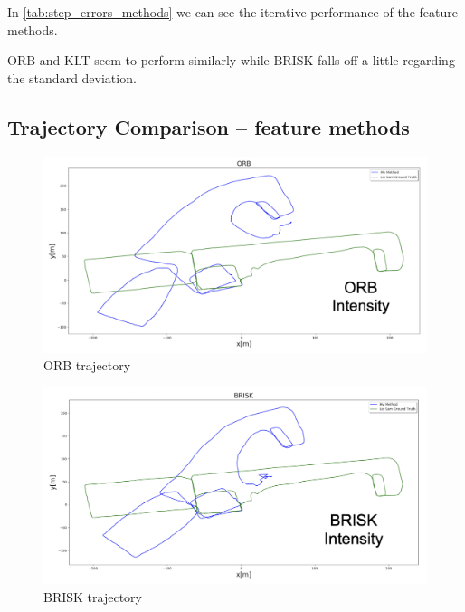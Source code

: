 {{{        In \cref{tab:step_errors_methods} we can see the iterative performance of the feature methods. 
        
        ORB and KLT seem to perform similarly while BRISK falls off a little regarding the standard deviation.

        }
        \subsection{Trajectory Comparison – feature methods}{

        \begin{figure}[!ht]
            \centering
            \includegraphics[scale = 0.5]{images/comparison_appendix/ORBt.png}
            \caption{ORB trajectory}
            \label{fig:ORB_trajectory}
        \end{figure}
        \clearpage

        \begin{figure}[!ht]
            \centering
            \includegraphics[scale = 0.5]{images/comparison_appendix/BRISKt.png}
            \caption{BRISK trajectory}
            \label{fig:BRISK_trajectory}
        \end{figure}

}}}
